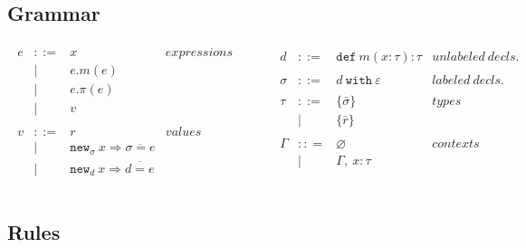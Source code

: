 \documentclass{llncs}
\newcommand{\keywadj}[1]{\mathtt{#1}}
\newcommand{\keyw}[1]{\keywadj{#1}~}
\begin{document}
\subsection{Grammar}

\[
\begin{array}{lll}
\begin{array}{lllr}
	e & ::= & x & expressions \\
  		& | & e.m(e)\\
  		& | & e.\pi(e)\\
		& | & v \\
		&&\\
		
	v & ::= & r & values \\
  		& | & \keywadj{new}_{\sigma}~x \Rightarrow \overline{\sigma = e} \\
  		& | & \keywadj{new}_d~x \Rightarrow \overline{d = e} \\
		&&\\

\end{array}
& ~~~~~~
&

\begin{array}{lllr}

	d & ::= & \keyw{def} m(x:\tau):\tau & unlabeled~decls.\\		&&\\
		
	\sigma & ::= & d~\keyw{with}\varepsilon  & labeled~ decls.\\
		&&\\
	\tau & ::= & \{ \bar \sigma \}  & types \\
		& | & \{ \bar r \} \\
		&&\\

	\Gamma & :: = & \varnothing & contexts\\
		& | & \Gamma,~x : \tau\\
		&&\\

&&\\

\end{array}
\end{array}
\]

\subsection{Rules}


\end{document}
